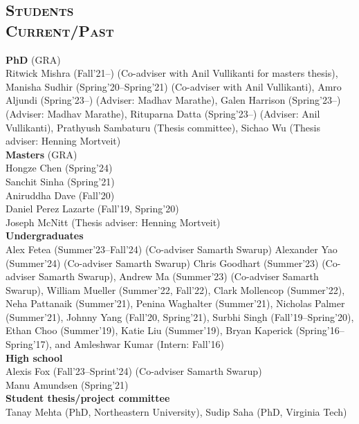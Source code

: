 \documentclass[margin,10pt]{res} %
\begin{document}
\begin{resume}
\section{\textnormal{\textsc{Students \\Current/Past}}}
\noindent\textbf{PhD} (GRA)\\
Ritwick Mishra (Fall'21--) (Co-adviser with Anil
Vullikanti for masters thesis),
Manisha Sudhir (Spring'20--Spring'21) (Co-adviser with Anil
Vullikanti),
Amro Aljundi (Spring'23--) (Adviser: Madhav Marathe),
Galen Harrison (Spring'23--) (Adviser: Madhav Marathe),
Rituparna Datta (Spring'23--) (Adviser: Anil Vullikanti),
Prathyush Sambaturu (Thesis committee),
Sichao Wu (Thesis adviser: Henning Mortveit)\vspace{.2cm}\\
\noindent\textbf{Masters} (GRA)\\
Hongze Chen (Spring'24)\\
Sanchit Sinha (Spring'21)\\
Aniruddha Dave (Fall'20)\\
Daniel Perez Lazarte (Fall'19, Spring'20)\\
Joseph McNitt (Thesis adviser: Henning Mortveit)\vspace{.2cm}\\
\noindent\textbf{Undergraduates}\\
Alex Fetea (Summer'23--Fall'24) (Co-adviser Samarth Swarup)
Alexander Yao (Summer'24) (Co-adviser Samarth Swarup)
Chris Goodhart (Summer'23) (Co-adviser Samarth Swarup),
Andrew Ma (Summer'23) (Co-adviser Samarth Swarup),
William Mueller (Summer'22, Fall'22),
Clark Mollencop (Summer'22),
Neha Pattanaik (Summer'21),
Penina Waghalter (Summer'21),
Nicholas Palmer (Summer'21),
Johnny Yang (Fall'20, Spring'21),
Surbhi Singh (Fall'19--Spring'20),
Ethan Choo (Summer'19),
Katie Liu (Summer'19),
Bryan Kaperick (Spring'16--Spring'17), and
Amleshwar Kumar (Intern: Fall'16) \vspace{.2cm}\\
\noindent\textbf{High school}\\
Alexis Fox (Fall'23--Sprint'24) (Co-adviser Samarth Swarup) \\
Manu Amundsen (Spring'21)\vspace{.2cm}\\
\noindent\textbf{Student thesis/project committee}\\
Tanay Mehta (PhD, Northeastern University),
Sudip Saha (PhD, Virginia Tech)

\end{resume}
\end{document}

